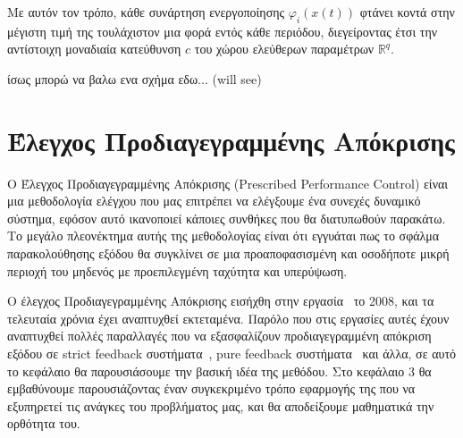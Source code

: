 Με αυτόν τον τρόπο, κάθε συνάρτηση ενεργοποίησης $\varphi_i(x(t))$ φτάνει κοντά στην μέγιστη τιμή της τουλάχιστον μια φορά εντός κάθε περιόδου, διεγείροντας έτσι την αντίστοιχη μοναδιαία κατεύθυνση $c$ του χώρου ελεύθερων παραμέτρων $\mathbb{R}^q$.

ίσως μπορώ να βαλω ενα σχήμα εδω... (will see)

\section{Έλεγχος Προδιαγεγραμμένης Απόκρισης}
Ο Έλεγχος Προδιαγεγραμμένης Απόκρισης (Prescribed Performance Control) είναι μια μεθοδολογία ελέγχου που μας επιτρέπει να ελέγξουμε ένα συνεχές δυναμικό σύστημα, εφόσον αυτό ικανοποιεί κάποιες συνθήκες που θα διατυπωθούν παρακάτω. Το μεγάλο πλεονέκτημα αυτής της μεθοδολογίας είναι ότι εγγυάται πως το σφάλμα παρακολούθησης εξόδου θα συγκλίνει σε μια προαποφασισμένη και οσοδήποτε μικρή περιοχή του μηδενός με προεπιλεγμένη ταχύτητα και υπερύψωση.

Ο έλεγχος Προδιαγεγραμμένης Απόκρισης εισήχθη στην εργασία~\cite{bechlioulis2008robust} το 2008, και τα τελευταία χρόνια έχει αναπτυχθεί εκτεταμένα. Παρόλο που στις εργασίες αυτές έχουν αναπτυχθεί πολλές παραλλαγές που να εξασφαλίζουν προδιαγεγραμμένη απόκριση εξόδου σε strict feedback συστήματα~\cite{bechlioulis2009adaptive}, pure feedback συστήματα~\cite{bechlioulis2014low} και άλλα, σε αυτό το κεφάλαιο θα παρουσιάσουμε την βασική ιδέα της μεθόδου. Στο κεφάλαιο 3 θα εμβαθύνουμε παρουσιάζοντας έναν συγκεκριμένο τρόπο εφαρμογής της που να εξυπηρετεί τις ανάγκες του προβλήματος μας, και θα αποδείξουμε μαθηματικά την ορθότητα του.

